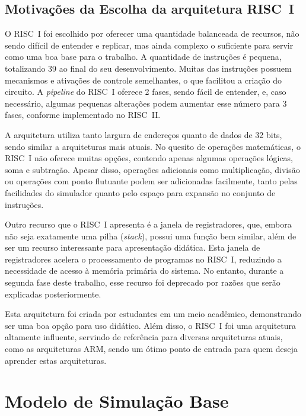 \documentclass[
	12pt,				%
	openright,			%
	oneside,			%
	a4paper,			%
	english,			%
	french,				%
	spanish,			%
	brazil,				%
	]{abntex2}
\begin{document}
\subsection{Motivações da Escolha da arquitetura RISC~I}

O RISC~I foi escolhido por oferecer uma quantidade balanceada de recursos, não sendo difícil de entender e replicar, mas ainda complexo o suficiente para servir como uma boa base para o trabalho. A quantidade de instruções é pequena, totalizando 39 ao final do seu desenvolvimento. Muitas das instruções possuem mecanismos e ativações de controle semelhantes, o que facilitou a criação do circuito. A \textit{pipeline} do RISC~I oferece 2 fases, sendo fácil de entender, e, caso necessário, algumas pequenas alterações podem aumentar esse número para 3 fases, conforme implementado no RISC~II.\cite{katevenis_reduced_1985}

A arquitetura utiliza tanto largura de endereços quanto de dados de 32 bits, sendo similar a arquiteturas mais atuais. No quesito de operações matemáticas, o RISC~I não oferece muitas opções, contendo apenas algumas operações lógicas, soma e subtração. Apesar disso, operações adicionais como multiplicação, divisão ou operações com ponto flutuante podem ser adicionadas facilmente, tanto pelas facilidades do simulador quanto pelo espaço para expansão no conjunto de instruções.\cite{peek_vlsi_1983}

Outro recurso que o RISC~I apresenta é a janela de registradores, que, embora não seja exatamente uma pilha (\textit{stack}), possui uma função bem similar, além de ser um recurso interessante para apresentação didática. Esta janela de registradores acelera o processamento de programas no RISC~I, reduzindo a necessidade de acesso à memória primária do sistema\cite{peek_vlsi_1983}. No entanto, durante a segunda fase deste trabalho, esse recurso foi deprecado por razões que serão explicadas posteriormente.

Esta arquitetura foi criada por estudantes em um meio acadêmico, demonstrando ser uma boa opção para uso didático. Além disso, o RISC~I foi uma arquitetura altamente influente, servindo de referência para diversas arquiteturas atuais, como as arquiteturas ARM, sendo um ótimo ponto de entrada para quem deseja aprender estas arquiteturas.\cite{tanenbaum_structured_2013}

\section{Modelo de Simulação Base}\label{sec:modeloSim}
\end{document}
